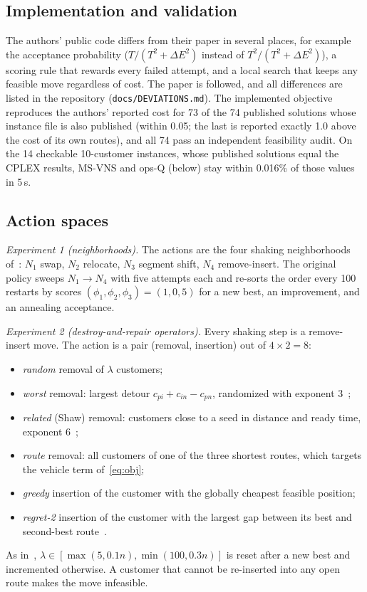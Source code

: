 \documentclass[conference]{IEEEtran}
\begin{document}
\subsection{Implementation and validation}
The authors' public code differs from their paper in several places, for example the acceptance probability ($T/(T^2+\Delta E^2)$ instead of $T^2/(T^2+\Delta E^2)$), a scoring rule that rewards every failed attempt, and a local search that keeps any feasible move regardless of cost. The paper is followed, and all differences are listed in the repository (\texttt{docs/DEVIATIONS.md}). The implemented objective reproduces the authors' reported cost for 73 of the 74 published solutions whose instance file is also published (within 0.05; the last is reported exactly 1.0 above the cost of its own routes), and all 74 pass an independent feasibility audit. On the 14 checkable 10-customer instances, whose published solutions equal the CPLEX results, MS-VNS and ops-Q (below) stay within 0.016\% of those values in 5\,s.

\subsection{Action spaces}
\textit{Experiment 1 (neighborhoods).} The actions are the four shaking neighborhoods of~\cite{masmoudi2026}: $N_1$ swap, $N_2$ relocate, $N_3$ segment shift, $N_4$ remove-insert. The original policy sweeps $N_1\to N_4$ with five attempts each and re-sorts the order every 100 restarts by scores $(\phi_1,\phi_2,\phi_3)=(1,0,5)$ for a new best, an improvement, and an annealing acceptance.

\textit{Experiment 2 (destroy-and-repair operators).} Every shaking step is a remove-insert move. The action is a pair (removal, insertion) out of $4\times 2=8$:
\begin{itemize}
\item \emph{random} removal of $\lambda$ customers;
\item \emph{worst} removal: largest detour $c_{pi}+c_{in}-c_{pn}$, randomized with exponent 3~\cite{ropke2006};
\item \emph{related} (Shaw) removal: customers close to a seed in distance and ready time, exponent 6~\cite{shaw1998};
\item \emph{route} removal: all customers of one of the three shortest routes, which targets the vehicle term of~\eqref{eq:obj};
\item \emph{greedy} insertion of the customer with the globally cheapest feasible position;
\item \emph{regret-2} insertion of the customer with the largest gap between its best and second-best route~\cite{ropke2006}.
\end{itemize}
As in~\cite{masmoudi2026}, $\lambda\in[\max(5,0.1n),\min(100,0.3n)]$ is reset after a new best and incremented otherwise. A customer that cannot be re-inserted into any open route makes the move infeasible.
\end{document}
